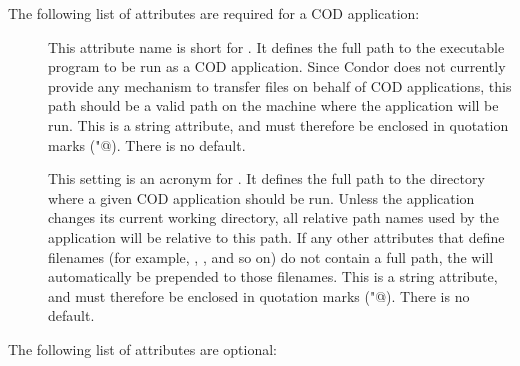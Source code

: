 
The following list of attributes are required for a COD application:

\begin{description}

 \item[] This attribute name is short for .
   It defines the full path to the executable program to be run as a
   COD application.
   Since Condor does not currently provide any mechanism to transfer
   files on behalf of COD applications, this path should be a valid
   path on the machine where the application will be run.
   This is a string attribute, and must therefore be enclosed in
   quotation marks (\verb@"@).
   There is no default.

 \item[] This setting is an acronym for .
   It defines the full path to the directory where a given COD
   application should be run.
   Unless the application changes its current working directory, all
   relative path names used by the application will be relative to
   this path.
   If any other attributes that define filenames (for example,
   , , and so on) do not contain a full path, the
    will automatically be prepended to those filenames.
   This is a string attribute, and must therefore be enclosed in 
   quotation marks (\verb@"@).
   There is no default.

\end{description}


The following list of attributes are optional:

